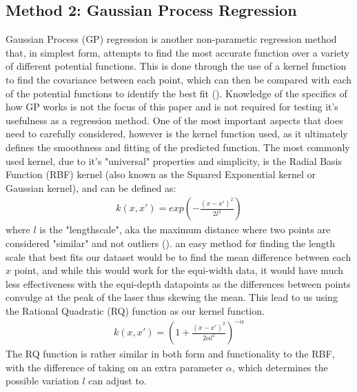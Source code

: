 \documentclass[letterpaper,12pt]{article}
\begin{document}
\subsection{Method 2: Gaussian Process Regression}
Gaussian Process (GP) regression is another non-parametic regression method that, in simplest
form, attempts to find the most accurate function over a variety of different potential functions.
This is done through the use of a kernel function to find the covariance between each point, which
can then be compared with each of the potential functions to identify the best fit 
(\cite{wang2020intuitive}). Knowledge of the specifics of how GP works is not the focus of
this paper and is not required for testing it's usefulness as a regression method. One of
the most important aspects that does need to carefully considered, however is the kernel 
function used, as it ultimately defines the smoothness and fitting of the predicted function.
The most commonly used kernel, due to it's "universal" properties and simplicity, is the
Radial Basis Function (RBF) kernel (also known as the Squared Exponential kernel or Gaussian
kernel), and can be defined as: 
\begin{align*}
    k(x,x')=exp(-\frac{(x-x')^{2}}{2l^{2}})
\end{align*}
where $l$ is the "lengthscale", aka the
maximum distance where two points are considered "similar" and not outliers (\cite{Duvenaud}). 
an easy method for finding the length scale that best fits our dataset would be to find the 
mean difference between each $x$ point, and while this would work for the equi-width data,
it would have much less effectiveness with the equi-depth datapoints as the differences between 
points convulge at the peak of the laser thus skewing the mean. This lead to us using the 
Rational Quadratic (RQ) function as our kernel function. 
\begin{align*}
    k(x,x')=(1+\frac{(x-x')^{2}}{2\alpha l^{2}})^{-\alpha}
\end{align*}
The RQ function is rather similar in 
both form and functionality to the RBF, with the difference of taking on an extra parameter 
$\alpha$, which determines the possible variation $l$ can adjust to. 
\end{document}
